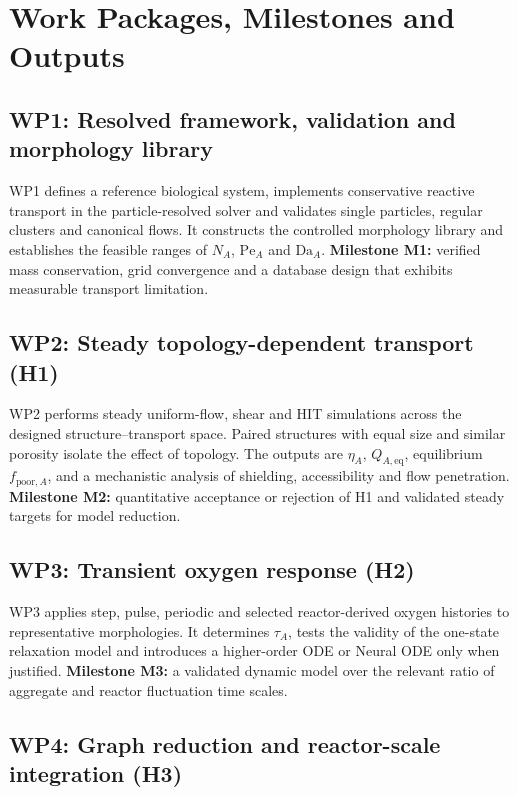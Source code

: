 \documentclass[11pt,a4paper]{article}
\newcommand{\Pe}{\mathrm{Pe}}
\newcommand{\Da}{\mathrm{Da}}
\begin{document}
\section{Work Packages, Milestones and Outputs}

\subsection*{WP1: Resolved framework, validation and morphology library}

WP1 defines a reference biological system, implements conservative reactive
transport in the particle-resolved solver and validates single particles,
regular clusters and canonical flows. It constructs the controlled morphology
library and establishes the feasible ranges of \(N_A\), \(\Pe_A\) and
\(\Da_A\). \textbf{Milestone M1:} verified mass conservation, grid convergence
and a database design that exhibits measurable transport limitation.

\subsection*{WP2: Steady topology-dependent transport (H1)}

WP2 performs steady uniform-flow, shear and HIT simulations across the designed
structure--transport space. Paired structures with equal size and similar
porosity isolate the effect of topology. The outputs are
\(\eta_A\), \(Q_{A,\mathrm{eq}}\), equilibrium
\(f_{\mathrm{poor},A}\), and a mechanistic analysis of shielding, accessibility
and flow penetration. \textbf{Milestone M2:} quantitative acceptance or
rejection of H1 and validated steady targets for model reduction.

\subsection*{WP3: Transient oxygen response (H2)}

WP3 applies step, pulse, periodic and selected reactor-derived oxygen histories
to representative morphologies. It determines \(\tau_A\), tests the validity
of the one-state relaxation model and introduces a higher-order ODE or Neural
ODE only when justified. \textbf{Milestone M3:} a validated dynamic model over
the relevant ratio of aggregate and reactor fluctuation time scales.

\subsection*{WP4: Graph reduction and reactor-scale integration (H3)}
\end{document}
